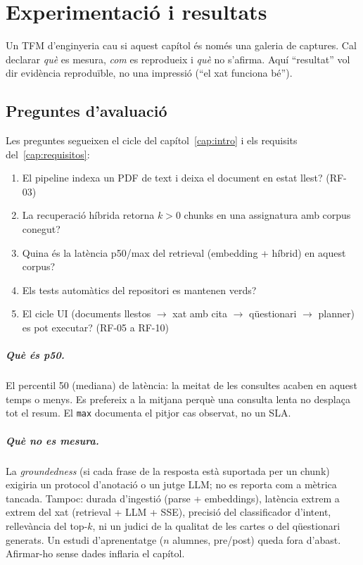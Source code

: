 \chapter{Experimentació i resultats}
\label{cap:resultados}

Un TFM d'enginyeria cau si aquest capítol és només una galeria de captures. Cal declarar \emph{què} es mesura, \emph{com} es reprodueix i \emph{què} no s'afirma. Aquí ``resultat'' vol dir evidència reproduïble, no una impressió (``el xat funciona bé'').

\section{Preguntes d'avaluació}

Les preguntes segueixen el cicle del capítol~\ref{cap:intro} i els requisits del~\ref{cap:requisitos}:

\begin{enumerate}[label=E\arabic*.]
  \item El pipeline indexa un PDF de text i deixa el document en estat llest? (RF-03)
  \item La recuperació híbrida retorna $k>0$ chunks en una assignatura amb corpus conegut?
  \item Quina és la latència p50/max del retrieval (embedding + híbrid) en aquest corpus?
  \item Els tests automàtics del repositori es mantenen verds?
  \item El cicle UI (documents llestos $\rightarrow$ xat amb cita $\rightarrow$ qüestionari $\rightarrow$ planner) es pot executar? (RF-05 a RF-10)
\end{enumerate}

\paragraph{Què és p50.}
El percentil 50 (mediana) de latència: la meitat de les consultes acaben en aquest temps o menys. Es prefereix a la mitjana perquè una consulta lenta no desplaça tot el resum. El \texttt{max} documenta el pitjor cas observat, no un SLA.

\paragraph{Què no es mesura.}
La \emph{groundedness} (si cada frase de la resposta està suportada per un chunk) exigiria un protocol d'anotació o un jutge LLM; no es reporta com a mètrica tancada. Tampoc: durada d'ingestió (parse + embeddings), latència extrem a extrem del xat (retrieval + LLM + SSE), precisió del classificador d'intent, rellevància del top-$k$, ni un judici de la qualitat de les cartes o del qüestionari generats. Un estudi d'aprenentatge ($n$ alumnes, pre/post) queda fora d'abast. Afirmar-ho sense dades inflaria el capítol.

